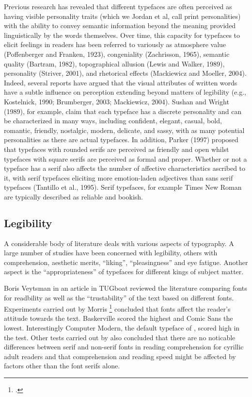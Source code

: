 Previous research has revealed that different typefaces are often perceived as having visible personality traits (which we Jordan et al, call print personalities) with the ability to convey semantic information beyond the meaning provided linguistically by the words themselves. Over time, this capacity for typefaces to elicit feelings in readers has been referred to variously as atmosphere value (Poffenberger and Franken, 1923), congeniality (Zachrisson, 1965), semantic quality (Bartram, 1982), topographical allusion (Lewis and Walker, 1989), personality (Striver, 2001), and rhetorical effects (Mackiewicz and Moeller, 2004). Indeed, several reports have argued that the visual attributes of written words have a subtle influence on perception extending beyond matters of legibility (e.g., Kostelnick, 1990; Brumberger, 2003; Mackiewicz, 2004). Sushan and Wright (1989), for example, claim that each typeface has a discrete personality and can be characterized in many ways, including confident, elegant, casual, bold, romantic, friendly, nostalgic, modern, delicate, and sassy, with as many potential personalities as there are actual typefaces. In addition, Parker (1997) proposed that typefaces with rounded serifs are perceived as friendly and open whilst typefaces with square serifs are perceived as formal and proper. Whether or not a typeface has a serif also affects the number of affective characteristics ascribed to it, with serif typefaces eliciting more emotion-laden adjectives than sans serif typefaces (Tantillo et al., 1995). Serif typefaces, for example Times New Roman are typically described as reliable and bookish. 


\subsection*{Legibility}

A considerable body of literature deals with various aspects of typography. A large number of studies have been concerned with legibility, others with comprehension, aesthetic merits, \enquote{liking}, \enquote{pleasingness} and eye fatigue. Another aspect is the \enquote{appropriateness} of typefaces for different kings of subject matter.

Boris Veytsman in an article in TUGboat \citep{boris2012} reviewed the literature comparing fonts for readbility as well as the ``trustability'' of the text based on different fonts. Experiments carried out by Morris \footcite{morris2012a} concluded that fonts affect the reader's attitude towards the text. Baskerville scored the highest and Comic Sans the lowest.
Interestingly Computer Modern, the default typeface of \tex, scored high in the test.  Other tests carried out by \cite{boris2012a} also concluded that there are no noticable differences between serif and non-serif fonts in reading comprehension for cyrillic adult readers and that comprehension and reading speed might be affected by factors other than the font serifs alone. 

